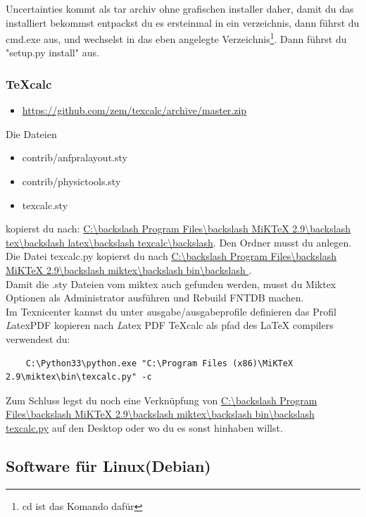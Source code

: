\documentclass[a4paper]{article}
\newcommand{\texcalc}{{\TeX}calc}
\begin{document}
Uncertainties kommt als tar archiv ohne grafischen installer daher, damit du das installiert bekommst entpackst du es
ersteinmal in ein verzeichnis, dann führst du cmd.exe aus, und wechselst in das eben angelegte
Verzeichnis\footnote{cd ist das Komando dafür}. Dann führst du "setup.py install" aus.

\subsubsection{\texcalc}

\begin{itemize}
\item \url{https://github.com/zem/texcalc/archive/master.zip}
\end{itemize}

Die Dateien
\begin{itemize}
\item contrib/anfpralayout.sty
\item contrib/physictools.sty
\item texcalc.sty
\end{itemize}
kopierst du nach: \url{C:\backslash Program Files\backslash MiKTeX 2.9\backslash tex\backslash latex\backslash texcalc\backslash}. Den Ordner musst du anlegen.
Die Datei texcalc.py kopierst du nach \url{C:\backslash Program Files\backslash MiKTeX 2.9\backslash miktex\backslash bin\backslash }. \\

Damit die .sty Dateien vom miktex auch gefunden werden, musst du Miktex Optionen als Administrator
ausführen und Rebuild FNTDB machen.\\

Im Texnicenter kannst du unter {\textit ausgabe/ausgabeprofile definieren} das Profil {\textit LatexPDF} kopieren nach {\textit Latex PDF TeXcalc}
als pfad des LaTeX compilers verwendest du:

\begin{verbatim}
	C:\Python33\python.exe "C:\Program Files (x86)\MiKTeX 2.9\miktex\bin\texcalc.py" -c
\end{verbatim}

Zum Schluss legst du noch eine Verknüpfung von \url{C:\backslash Program Files\backslash MiKTeX 2.9\backslash miktex\backslash bin\backslash texcalc.py}
auf den Desktop oder wo du es sonst hinhaben willst.


\subsection{Software für Linux(Debian)}
\end{document}

